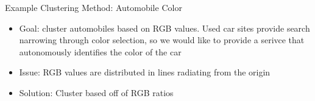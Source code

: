 \documentclass[final]{beamer}
\newlength{\restofpage}
\begin{document}
\begin{frame}[t]
\begin{columns}[t]
\begin{column}{\restofpage}
\begin{columns}[c]
\begin{block}{Example Clustering Method: \newline Automobile Color}
            \centering
            \begin{itemize}
              \item Goal: cluster automobiles based on RGB values. Used car sites provide search narrowing through color selection, so we would like to provide a serivce that autonomously identifies the color of the car
              \item Issue: RGB values are distributed in lines radiating from the origin
              \item Solution: Cluster based off of RGB ratios


\end{itemize}
\end{block}
\end{columns}
\end{column}
\end{columns}
\end{frame}
\end{document}

